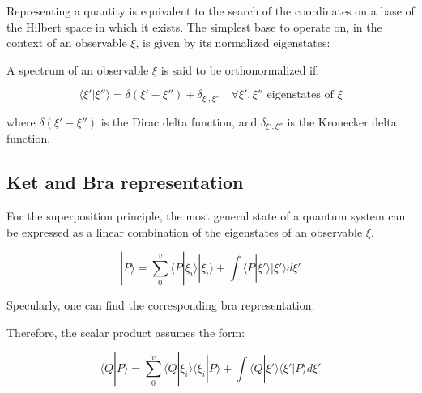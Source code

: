 \documentclass{report}
\begin{document}
Representing a quantity is equivalent to the search of the coordinates on a base of the Hilbert space in which it exists.
The simplest base to operate on, in the context of an observable $\xi$, is given by its normalized eigenstates:

\begin{tcolorbox}[colframe=gray!90, colback=blue!5, coltitle=white, title=\textbf{Definition: Orthonormalized Eigenstates}, fonttitle=\large\bfseries]

  A spectrum of an observable $\xi$ is said to be orthonormalized if:

  \begin{equation}
    \langle \xi'|\xi''\rangle  = \delta(\xi'-\xi'') + \delta_{\xi',\xi''} \quad \forall \xi',\xi'' \text{ eigenstates of $\xi$}
  \end{equation}

  where $\delta(\xi'-\xi'')$ is the Dirac delta function, and $\delta_{\xi',\xi''}$ is the Kronecker delta function.

\end{tcolorbox}

\subsection{Ket and Bra representation}

For the superposition principle, the most general state of a quantum system can be expressed as a linear combination of the eigenstates of an observable $\xi$.

\begin{tcolorbox}[colframe=gray!50, colback=gray!10, coltitle=black, title=Ket representation]
  \begin{equation}
    |P\rangle = \sum_{0}^{v} \langle P|\xi_i\rangle |\xi_i\rangle + \int \langle P|\xi'\rangle |\xi'\rangle d\xi'
  \end{equation}
\end{tcolorbox}

Specularly, one can find the corresponding bra representation.

Therefore, the scalar product assumes the form:

\begin{tcolorbox}[colframe=gray!50, colback=gray!10, coltitle=black, title=Scalar product]
  \begin{equation}
    \langle Q|P\rangle = \sum_{0}^{v} \langle Q|\xi_i\rangle \langle \xi_i|P\rangle + \int \langle Q|\xi'\rangle \langle \xi'|P\rangle d\xi'
  \end{equation}
\end{tcolorbox}
\end{document}
